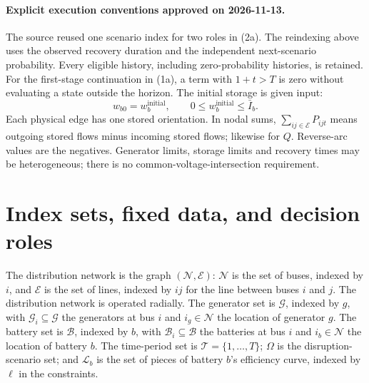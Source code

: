 \documentclass[10pt]{article}
\begin{document}
\paragraph{Explicit execution conventions approved on 2026-11-13.}
The source reused one scenario index for two roles in (2a). The reindexing
above uses the observed recovery duration and the independent next-scenario
probability. Every eligible history, including zero-probability histories,
is retained. For the first-stage continuation in (1a), a term with $1+t>T$
is zero without evaluating a state outside the horizon.
The initial storage is given input:
\[w_{b0}=w_b^{\mathrm{initial}},\qquad 0\leq w_b^{\mathrm{initial}}\leq\bar I_b.\]
Each physical edge has one stored orientation. In nodal sums,
$\sum_{ij\in\mathcal E}P_{ijt}$ means outgoing stored flows minus incoming
stored flows; likewise for $Q$. Reverse-arc values are the negatives.
Generator limits, storage limits and recovery times may be heterogeneous;
there is no common-voltage-intersection requirement.

\section*{Index sets, fixed data, and decision roles}
The distribution network is the graph $(\mathcal N,\mathcal E)$: $\mathcal N$ is the set of buses, indexed by $i$, and $\mathcal E$ is the set of lines, indexed by $ij$ for the line between buses $i$ and $j$. The distribution network is operated radially. The generator set is $\mathcal G$, indexed by $g$, with $\mathcal G_i\subseteq\mathcal G$ the generators at bus $i$ and $i_g\in\mathcal N$ the location of generator $g$. The battery set is $\mathcal B$, indexed by $b$, with $\mathcal B_i\subseteq\mathcal B$ the batteries at bus $i$ and $i_b\in\mathcal N$ the location of battery $b$. The time-period set is $\mathcal T=\{1,\ldots,T\}$; $\Omega$ is the disruption-scenario set; and $\mathcal L_b$ is the set of pieces of battery $b$'s efficiency curve, indexed by $\ell$ in the constraints.
\end{document}
